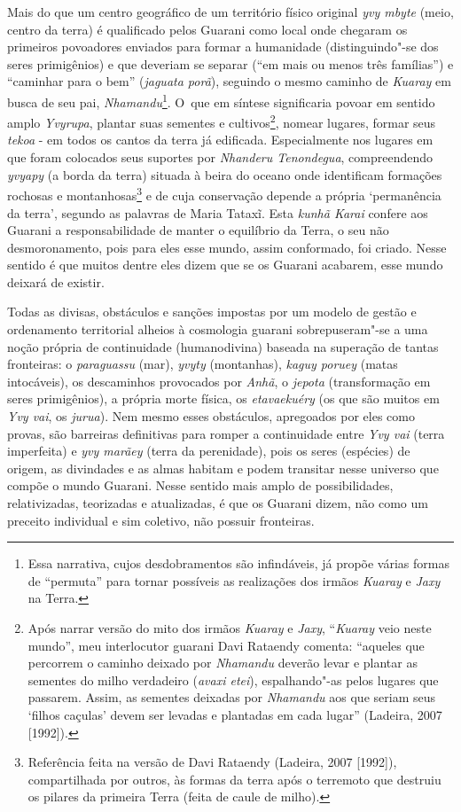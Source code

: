 Mais do que um centro geográfico de um território físico original \emph{yvy
mbyte} (meio, centro da terra) é qualificado pelos Guarani como local
onde chegaram os primeiros povoadores enviados para formar a humanidade
(distinguindo"-se dos seres primigênios) e que deveriam se separar (``em
mais ou menos três famílias'') e ``caminhar para o bem'' (\emph{jaguata porã}),
seguindo o mesmo caminho de \emph{Kuaray} em busca de seu pai,
\emph{Nhamandu}\footnote{Essa narrativa, cujos desdobramentos são infindáveis,
já propõe várias formas de ``permuta'' para tornar possíveis as
realizações dos irmãos \emph{Kuaray} e \emph{Jaxy} na Terra.}. O~que em síntese
significaria povoar em sentido amplo \emph{Yvyrupa}, plantar suas sementes e
cultivos\footnote{Após narrar versão do mito dos irmãos \emph{Kuaray} e \emph{Jaxy},
``\emph{Kuaray} veio neste mundo'', meu interlocutor guarani Davi Rataendy
comenta: ``aqueles que percorrem o caminho deixado por \emph{Nhamandu} deverão
levar e plantar as sementes do milho verdadeiro (\emph{avaxi etei}),
espalhando"-as pelos lugares que passarem. Assim, as sementes deixadas
por \emph{Nhamandu} aos que seriam seus ‘filhos caçulas’ devem ser levadas e
plantadas em cada lugar'' (Ladeira, 2007 [1992]).}, nomear lugares,
formar seus \emph{tekoa} - em todos os cantos da terra já edificada.
Especialmente nos lugares em que foram colocados seus suportes por
\emph{Nhanderu Tenondegua}, compreendendo \emph{yvyapy} (a borda da terra) situada à
beira do oceano onde identificam formações rochosas e
montanhosas\footnote{Referência feita na versão de Davi Rataendy
(Ladeira, 2007 [1992]), compartilhada por outros, às formas da terra
após o terremoto que destruiu os pilares da primeira Terra (feita de
caule de milho). } e de cuja conservação depende a própria ‘permanência
da terra’, segundo as palavras de Maria Tataxĩ.
Esta \emph{kunhã Karai} confere aos Guarani a responsabilidade de manter o
equilíbrio da Terra, o seu não desmoronamento, pois para eles esse
mundo, assim conformado, foi criado. Nesse sentido é que muitos dentre
eles dizem que se os Guarani acabarem, esse mundo deixará de existir. 

Todas as divisas, obstáculos e sanções impostas por um modelo de gestão
e ordenamento territorial alheios à cosmologia guarani sobrepuseram"-se
a uma noção própria de continuidade (humanodivina) baseada na superação
de tantas fronteiras: o \emph{paraguassu} (mar), \emph{yvyty} (montanhas), \emph{kaguy
poruey} (matas intocáveis), os descaminhos provocados por \emph{Anhã}, o \emph{jepota}
(transformação em seres primigênios), a própria morte física, os
\emph{etavaekuéry} (os que são muitos em \emph{Yvy vai}, os \emph{jurua}). Nem mesmo esses
obstáculos, apregoados por eles como provas, são barreiras definitivas
para romper a continuidade entre \emph{Yvy vai} (terra imperfeita) e \emph{yvy
marãey} (terra da perenidade), pois os seres (espécies) de origem, as
divindades e as almas habitam e podem transitar nesse universo que
compõe o mundo Guarani. Nesse sentido mais amplo de possibilidades,
relativizadas, teorizadas e atualizadas, é que os Guarani dizem, não
como um preceito individual e sim coletivo, não possuir fronteiras. 

